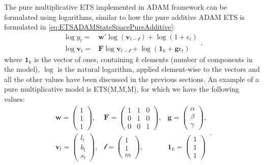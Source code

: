 \documentclass[
]{book}
\theoremstyle{definition}
\theoremstyle{definition}
\theoremstyle{definition}
\theoremstyle{definition}
\theoremstyle{remark}
\begin{document}
The pure multiplicative ETS implemented in ADAM framework can be formulated using logarithms, similar to how the pure additive ADAM ETS is formulated in \eqref{eq:ETSADAMStateSpacePureAdditive}:
\begin{equation}
  \begin{aligned}
        \log y_t = & \mathbf{w}' \log(\mathbf{v}_{t-\boldsymbol{\mathscr{l}}}) + \log(1 + \epsilon_{t}) \\
        \log \mathbf{v}_{t} = & \mathbf{F} \log \mathbf{v}_{t-\boldsymbol{\mathscr{l}}} + \log(\mathbf{1}_k + \mathbf{g} \epsilon_t)
  \end{aligned},
  \label{eq:ETSADAMStateSpacePureMultiplicative}
\end{equation}
where \(\mathbf{1}_k\) is the vector of ones, containing \(k\) elements (number of components in the model), \(\log\) is the natural logarithm, applied element-wise to the vectors and all the other values have been discussed in the previous sections. An example of a pure multiplicative model is ETS(M,M,M), for which we have the following values:
\begin{equation}
  \begin{aligned}
    \mathbf{w} = \begin{pmatrix} 1 \\ 1 \\ 1 \end{pmatrix}, & \mathbf{F} = \begin{pmatrix} 1 & 1 & 0 \\ 0 & 1 & 0 \\ 0 & 0 & 1 \end{pmatrix}, & \mathbf{g} = \begin{pmatrix} \alpha \\ \beta \\ \gamma \end{pmatrix}, \\
    \mathbf{v}_{t} = \begin{pmatrix} l_t \\ b_t \\ s_t \end{pmatrix}, & \boldsymbol{\mathscr{l}} = \begin{pmatrix} 1 \\ 1 \\ m \end{pmatrix}, & \mathbf{1}_k = \begin{pmatrix} 1 \\ 1 \\ 1 \end{pmatrix}
  \end{aligned}.
  \label{eq:ETSADAMMMMMatrices}
\end{equation}
\end{document}
